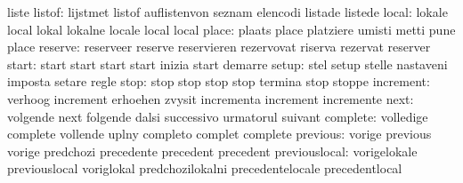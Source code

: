                            liste
                   listof: lijstmet                  listof
                           auflistenvon              seznam
                           elencodi                  listade
                           listede
                    local: lokale                    local
                           lokal                     lokalne
                           locale                    local
                           local
                    place: plaats                    place
                           platziere                 umisti
                           metti                     pune
                           place
                  reserve: reserveer                 reserve
                           reservieren               rezervovat
                           riserva                   rezervat
                           reserver
                    start: start                     start
                           start                     start
                           inizia                    start
                           demarre
                    setup: stel                      setup
                           stelle                    nastaveni
                           imposta                   setare
                           regle
                     stop: stop                      stop
                           stop                      stop
                           termina                   stop
                           stoppe
                increment: verhoog                   increment
                           erhoehen                  zvysit
                           incrementa                increment
                           incremente
                     next: volgende                  next
                           folgende                  dalsi
                           successivo                urmatorul
                           suivant
                 complete: volledige                 complete
                           vollende                  uplny
                           completo                  complet
                           complete
                 previous: vorige                    previous
                           vorige                    predchozi
                           precedente                precedent
                           precedent
            previouslocal: vorigelokale              previouslocal
                           voriglokal                predchozilokalni
                           precedentelocale          precedentlocal
